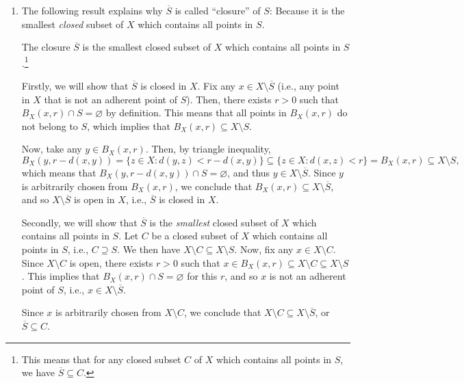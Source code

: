 \begin{enumerate}
\item The following result explains why \(\overline{S}\) is called ``closure''
of \(S\): Because it is the smallest \emph{closed} subset of \(X\) which
contains all points in \(S\).

\begin{theorem}
\label{thm:closure-smallest-closed}
The closure \(\overline{S}\) is the smallest closed subset of \(X\) which
contains all points in \(S\).\footnote{This means that for any closed subset
\(C\) of \(X\) which contains all points in \(S\), we have
\(\overline{S}\subseteq C\).}
\end{theorem}
\begin{pf}
Firstly, we will show that \(\overline{S}\) is closed in \(X\). Fix any \(x\in
X\setminus\overline{S}\) (i.e., any point in \(X\) that is not an adherent
point of \(S\)). Then, there exists \(r>0\) such that \(B_X(x,r)\cap
S=\varnothing\) by definition. This means that all points in \(B_X(x,r)\) do
not belong to \(S\), which implies that \(B_X(x,r)\subseteq X\setminus S\).

Now, take any \(y\in B_X(x,r)\). Then, by triangle inequality,
\[
B_X(y,r-d(x,y))=\{z\in X:d(y,z)<r-d(x,y)\}\subseteq \{z\in X:d(x,z)<r\}=B_X(x,r)\subseteq X\setminus S,
\]
which means that \(B_X(y,r-d(x,y))\cap S=\varnothing\), and thus \(y\in
X\setminus\overline{S}\). Since \(y\) is arbitrarily chosen from \(B_X(x,r)\),
we conclude that \(B_X(x,r)\subseteq X\setminus \overline{S}\), and so
\(X\setminus\overline{S}\) is open in \(X\), i.e., \(\overline{S}\) is closed
in \(X\).

Secondly, we will show that \(\overline{S}\) is the \emph{smallest} closed
subset of \(X\) which contains all points in \(S\). Let \(C\) be a closed
subset of \(X\) which contains all points in \(S\), i.e., \(C\supseteq S\). We
then have \(X\setminus C\subseteq X\setminus S\). Now, fix any \(x\in
X\setminus C\). Since \(X\setminus C\) is open, there exists \(r>0\) such that
\(x\in B_X(x,r)\subseteq X\setminus C\subseteq X\setminus S\). This implies
that \(B_X(x,r)\cap S=\varnothing\) for this \(r\), and so \(x\) is not an
adherent point of \(S\), i.e., \(x\in X\setminus\overline{S}\).

Since \(x\) is arbitrarily chosen from \(X\setminus C\), we conclude that
\(X\setminus C\subseteq X\setminus\overline{S}\), or \(\overline{S}\subseteq
C\).
\end{pf}


\end{enumerate}

